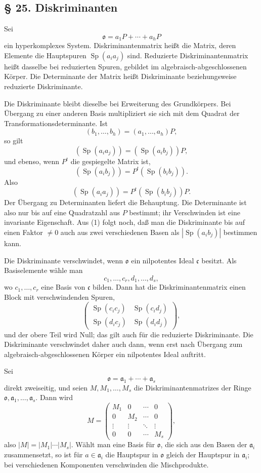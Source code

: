 \documentclass[11pt]{article}
\providecommand{\mo}{\mathfrak{o}}
\providecommand{\ma}{\mathfrak{a}}
\providecommand{\mc}{\mathfrak{c}}
\begin{document}
\subsection*{§ 25. Diskriminanten}
Sei
\[
        \mo=a_1P+\cdots+a_hP
\]
ein hyperkomplexes System. Diskriminantenmatrix heißt die Matrix, deren Elemente die Hauptspuren $\operatorname{Sp}(a_i a_j)$ sind. Reduzierte Diskriminantenmatrix heißt dasselbe bei reduzierten Spuren, gebildet im algebraisch-abgeschlossenen Körper. Die Determinante der Matrix heißt Diskriminante beziehungsweise reduzierte Diskriminante.

Die Diskriminante bleibt dieselbe bei Erweiterung des Grundkörpers. Bei Übergang zu einer anderen Basis multipliziert sie sich mit dem Quadrat der Transformationsdeterminante. Ist
\[
        (b_1,\ldots,b_h)=(a_1,\ldots,a_h)P,
\]
so gilt
\[
        (\operatorname{Sp}(a_i a_j))=(\operatorname{Sp}(a_i b_j))P,             \tag{1}
\]
und ebenso, wenn $P^t$ die gespiegelte Matrix ist,
\[
        (\operatorname{Sp}(a_i b_j))=P^t(\operatorname{Sp}(b_i b_j)).           \tag{1a}
\]
Also
\[
        (\operatorname{Sp}(a_i a_j))=P^t(\operatorname{Sp}(b_i b_j))P.
\]
Der Übergang zu Determinanten liefert die Behauptung. Die Determinante ist also nur bis auf eine Quadratzahl aus $P$ bestimmt; ihr Verschwinden ist eine invariante Eigenschaft. Aus (1) folgt noch, daß man die Diskriminante bis auf einen Faktor $\ne0$ auch aus zwei verschiedenen Basen als $|\operatorname{Sp}(a_i b_j)|$ bestimmen kann.

Die Diskriminante verschwindet, wenn $\mo$ ein nilpotentes Ideal $\mc$ besitzt. Als Basiselemente wähle man
\[
        c_1,\ldots,c_r,d_1,\ldots,d_s,
\]
wo $c_1,\ldots,c_r$ eine Basis von $\mc$ bilden. Dann hat die Diskriminantenmatrix einen Block mit verschwindenden Spuren,
\[
        \begin{pmatrix}
        \operatorname{Sp}(c_i c_j)&\operatorname{Sp}(c_i d_j)\\
        \operatorname{Sp}(d_i c_j)&\operatorname{Sp}(d_i d_j)
        \end{pmatrix},
\]
und der obere Teil wird Null; das gilt auch für die reduzierte Diskriminante. Die Diskriminante verschwindet daher auch dann, wenn erst nach Übergang zum algebraisch-abgeschlossenen Körper ein nilpotentes Ideal auftritt.

Sei
\[
        \mo=\ma_1+\cdots+\ma_s
\]
direkt zweiseitig, und seien $M,M_1,\ldots,M_s$ die Diskriminantenmatrizes der Ringe $\mo,\ma_1,\ldots,\ma_s$. Dann wird
\[
        M=\begin{pmatrix}
        M_1&0&\cdots&0\\
        0&M_2&\cdots&0\\
        \vdots&\vdots&\ddots&\vdots\\
        0&0&\cdots&M_s
        \end{pmatrix},
\]
also $|M|=|M_1|\cdots|M_s|$. Wählt man eine Basis für $\mo$, die sich aus den Basen der $\ma_i$ zusammensetzt, so ist für $a\in\ma_i$ die Hauptspur in $\mo$ gleich der Hauptspur in $\ma_i$; bei verschiedenen Komponenten verschwinden die Mischprodukte.
\end{document}
